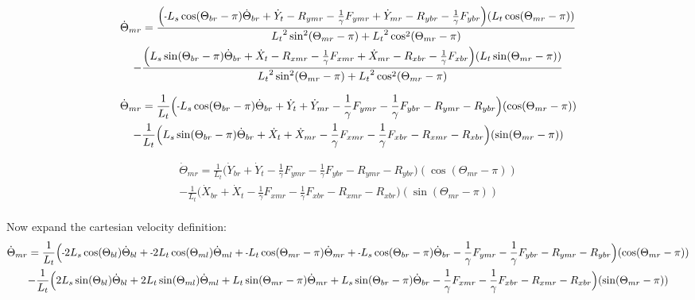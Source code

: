 \documentclass[11pt, landscape]{article}
\newcommand{\mn}{\scalebox{0.7}[1.0]{-}}
\begin{document}
\begin{multline}
\dot{\Theta}_{mr} =
\frac{\Big( \mn L_{s}\cos(\Theta_{br}-\pi) \dot{\Theta}_{br} + \dot{Y}_{t } - R_{ymr} - \frac{1}{\gamma}F_{ymr} + \dot{Y}_{mr} -R_{ybr} - \frac{1}{\gamma}F_{ybr}\Big) (L_{t}\cos(\Theta_{mr}-\pi))}
{{L_{t}}^2\sin^2(\Theta_{mr}-\pi) + {L_{t}}^2\cos^2(\Theta_{mr}-\pi)} \\
  - \frac{\Big(L_{s}\sin(\Theta_{br}-\pi) \dot{\Theta}_{br} + \dot{X}_{t } - R_{xmr} - \frac{1}{\gamma}F_{xmr} + \dot{X}_{mr} - R_{xbr} -\frac{1}{\gamma}F_{xbr} \Big)(L_{t}\sin(\Theta_{mr}-\pi))}
  {{L_{t}}^2\sin^2(\Theta_{mr}-\pi) + {L_{t}}^2\cos^2(\Theta_{mr}-\pi)}
\end{multline}

\begin{multline}
\dot{\Theta}_{mr} =
\frac{1}{L_{t}} \Big( \mn L_{s}\cos(\Theta_{br}-\pi) \dot{\Theta}_{br} + \dot{Y}_{t }  + \dot{Y}_{mr} - \frac{1}{\gamma}F_{ymr} - \frac{1}{\gamma}F_{ybr} - R_{ymr} - R_{ybr} \Big)(\cos(\Theta_{mr}-\pi))\\
  - \frac{1}{L_{t}}\Big(L_{s}\sin(\Theta_{br}-\pi) \dot{\Theta}_{br} + \dot{X}_{t } + \dot{X}_{mr} - \frac{1}{\gamma}F_{xmr} - \frac{1}{\gamma}F_{xbr} - R_{xmr} - R_{xbr} \Big)(\sin(\Theta_{mr}-\pi))
\end{multline}

\begin{multline}
\dot{\Theta}_{mr} =
\frac{1}{L_{t}} \Big(\dot{Y}_{br} + \dot{Y}_{t } - \frac{1}{\gamma}F_{ymr} - \frac{1}{\gamma}F_{ybr} - R_{ymr} - R_{ybr} \Big)(\cos(\Theta_{mr}-\pi))\\
  - \frac{1}{L_{t}}\Big(\dot{X}_{br} + \dot{X}_{t } - \frac{1}{\gamma}F_{xmr} - \frac{1}{\gamma}F_{xbr} - R_{xmr} - R_{xbr} \Big)(\sin(\Theta_{mr}-\pi))
\end{multline}
\\
Now expand the cartesian velocity definition: \\

\begin{multline}
\dot{\Theta}_{mr} =
\frac{1}{L_{t}} \Big(\mn 2L_{s}\cos(\Theta_{bl})\dot{\Theta}_{bl} + \mn 2L_{t}\cos(\Theta_{ml})\dot{\Theta}_{ml} + \mn L_{t}\cos(\Theta_{mr}-\pi)\dot{\Theta}_{mr} + \mn L_{s}\cos(\Theta_{br}-\pi)\dot{\Theta}_{br}
  - \frac{1}{\gamma}F_{ymr} - \frac{1}{\gamma}F_{ybr} - R_{ymr} - R_{ybr} \Big)(\cos(\Theta_{mr}-\pi))\\
  - \frac{1}{L_{t}}\Big(2L_{s}\sin(\Theta_{bl})\dot{\Theta}_{bl} + 2L_{t}\sin(\Theta_{ml})\dot{\Theta}_{ml} + L_{t}\sin(\Theta_{mr}-\pi)\dot{\Theta}_{mr} + L_{s}\sin(\Theta_{br}-\pi)\dot{\Theta}_{br}
   - \frac{1}{\gamma}F_{xmr} - \frac{1}{\gamma}F_{xbr} - R_{xmr} - R_{xbr} \Big)(\sin(\Theta_{mr}-\pi))
\end{multline}
\end{document}
